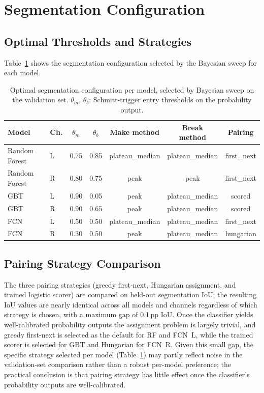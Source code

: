 \section{Segmentation Configuration}
\label{sec:eval-seg}

\subsection{Optimal Thresholds and Strategies}
Table~\ref{tab:thresholds} shows the segmentation configuration selected by the
Bayesian sweep for each model.

\begin{table}[t]
\centering
\small
\caption{Optimal segmentation configuration per model, selected by Bayesian sweep on
the validation set. $\theta_m$, $\theta_b$: Schmitt-trigger entry thresholds on the
probability output.}
\label{tab:thresholds}
\begin{tabular}{llccccc}
\toprule
\textbf{Model} & \textbf{Ch.} & \textbf{$\theta_m$} & \textbf{$\theta_b$}
  & \textbf{Make method} & \textbf{Break method} & \textbf{Pairing} \\
\midrule
Random Forest & L & 0.75 & 0.85 & plateau\_median & plateau\_median & first\_next \\
Random Forest & R & 0.80 & 0.75 & peak & peak & first\_next \\
GBT           & L & 0.90 & 0.05 & peak & plateau\_median & scored \\
GBT           & R & 0.90 & 0.65 & peak & plateau\_median & scored \\
FCN           & L & 0.50 & 0.50 & plateau\_median & plateau\_median & first\_next \\
FCN           & R & 0.30 & 0.50 & peak & plateau\_median & hungarian \\
\bottomrule
\end{tabular}
\end{table}

\subsection{Pairing Strategy Comparison}
The three pairing strategies (greedy first-next, Hungarian assignment, and trained
logistic scorer) are compared on held-out segmentation IoU; the resulting IoU
values are nearly identical across all models and channels regardless of
which strategy is chosen, with a maximum gap of 0.1\,pp IoU.
Once the classifier yields well-calibrated probability outputs the assignment
problem is largely trivial, and greedy first-next is selected as the default for
RF and FCN~L, while the trained scorer is selected for GBT and Hungarian for
FCN~R. Given this small gap, the specific strategy selected per model
(Table~\ref{tab:thresholds}) may partly reflect noise in the validation-set
comparison rather than a robust per-model preference; the practical conclusion is
that pairing strategy has little effect once the classifier's probability outputs
are well-calibrated.


